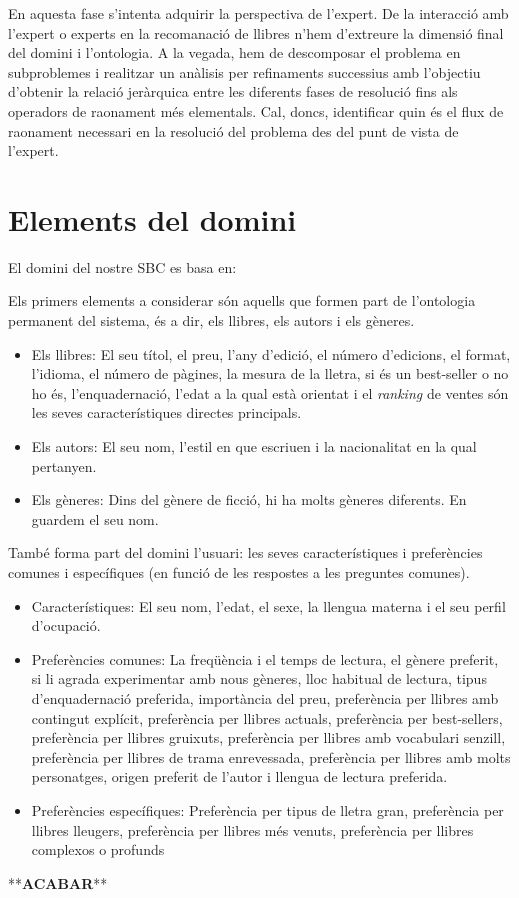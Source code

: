 
En aquesta fase s'intenta adquirir la perspectiva de l'expert. De la interacció amb l'expert o experts en la recomanació de llibres n'hem d'extreure la dimensió final del domini i l'ontologia. A  la vegada, hem de descomposar el problema en subproblemes i realitzar un anàlisis per refinaments successius amb l'objectiu d'obtenir la relació jeràrquica entre les diferents fases de resolució fins als operadors de raonament més elementals. Cal, doncs, identificar quin és el flux de raonament necessari en la resolució del problema des del punt de vista de l'expert.

\section{Elements del domini}

El domini del nostre SBC es basa en:

Els primers elements a considerar són aquells que formen part de l'ontologia permanent del sistema, és a dir, els llibres, els autors i els gèneres.
\begin{itemize}
  \item Els llibres: El seu títol, el preu, l'any d'edició, el número d'edicions, el format, l'idioma, el número de pàgines, la mesura de la lletra, si és un best-seller o no ho és, l'enquadernació, l'edat a la qual està orientat i el \emph{ranking} de ventes són les seves característiques directes principals.
  \item Els autors: El seu nom, l'estil en que escriuen i la nacionalitat en la qual pertanyen.
  \item Els gèneres: Dins del gènere de ficció, hi ha molts gèneres diferents. En guardem el seu nom.
\end{itemize}

També forma part del domini l'usuari: les seves característiques i preferències comunes i específiques (en funció de les respostes a les preguntes comunes).
\begin{itemize}
  \item Característiques: El seu nom, l'edat, el sexe, la llengua materna i el seu perfil d'ocupació.
  \item Preferències comunes: La freqüència i el temps de lectura, el gènere preferit, si li agrada experimentar amb nous gèneres, lloc habitual de lectura, tipus d'enquadernació preferida, importància del preu, preferència per llibres amb contingut explícit, preferència per llibres actuals, preferència per best-sellers, preferència per llibres gruixuts, preferència per llibres amb vocabulari senzill, preferència per llibres de trama enrevessada, preferència per llibres amb molts personatges, origen preferit de l'autor i llengua de lectura preferida.
  \item Preferències específiques: Preferència per tipus de lletra gran, preferència per llibres lleugers, preferència per llibres més venuts, preferència per llibres complexos o profunds 
\end{itemize}
  **\textbf{ACABAR}**

